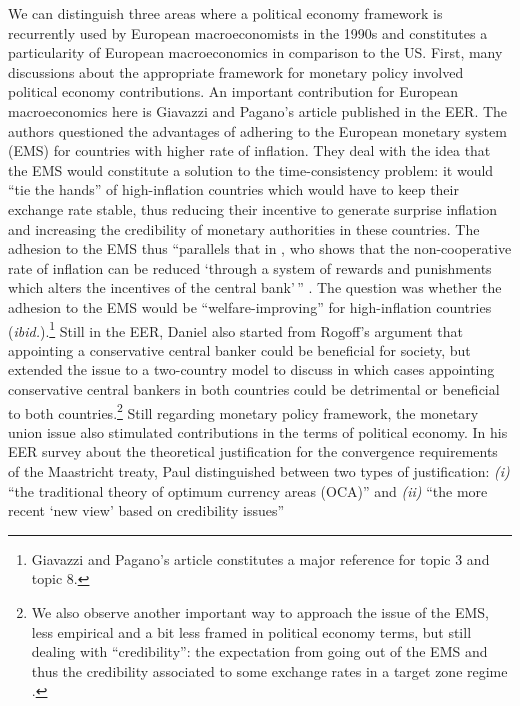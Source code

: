 \documentclass[]{elsarticle} %
\begin{document}
We can distinguish three areas where a political economy framework is
recurrently used by European macroeconomists in the 1990s and
constitutes a particularity of European macroeconomics in comparison to
the US. First, many discussions about the appropriate framework for
monetary policy involved political economy contributions. An important
contribution for European macroeconomics here is Giavazzi and Pagano's
\citeyearpar{giavazzi1988} article published in the EER. The authors
questioned the advantages of adhering to the European monetary system
(EMS) for countries with higher rate of inflation. They deal with the
idea that the EMS would constitute a solution to the time-consistency
problem: it would ``tie the hands'' of high-inflation countries which
would have to keep their exchange rate stable, thus reducing their
incentive to generate surprise inflation and increasing the credibility
of monetary authorities in these countries. The adhesion to the EMS thus
``parallels that in \citet{rogoff1985b}, who shows that the
non-cooperative rate of inflation can be reduced `through a system of
rewards and punishments which alters the incentives of the central
bank'\,'' \citep[1057]{giavazzi1988}. The question was whether the
adhesion to the EMS would be ``welfare-improving'' for high-inflation
countries (\emph{ibid.}).\footnote{Giavazzi and Pagano's article
  constitutes a major reference for topic 3 and topic 8.} Still in the
EER, Daniel \citet{laskar1989} also started from Rogoff's
\citeyearpar{rogoff1985b} argument that appointing a conservative
central banker could be beneficial for society, but extended the issue
to a two-country model to discuss in which cases appointing conservative
central bankers in both countries could be detrimental or beneficial to
both countries.\footnote{We also observe another important way to
  approach the issue of the EMS, less empirical and a bit less framed in
  political economy terms, but still dealing with ``credibility'': the
  expectation from going out of the EMS and thus the credibility
  associated to some exchange rates in a target zone regime
  \citep{svensson1993a, rose1994}.} Still regarding monetary policy
framework, the monetary union issue also stimulated contributions in the
terms of political economy. In his EER survey about the theoretical
justification for the convergence requirements of the Maastricht treaty,
Paul distinguished between two types of justification: \emph{(i)} ``the
traditional theory of optimum currency areas (OCA)'' and \emph{(ii)}
``the more recent `new view' based on credibility issues''
\end{document}
